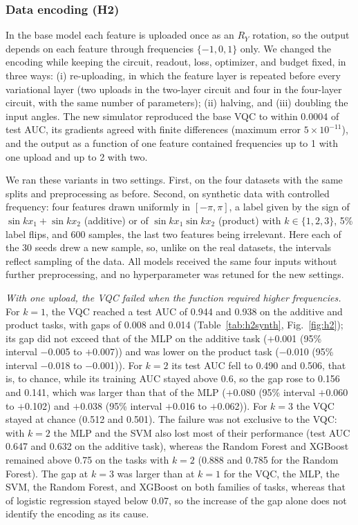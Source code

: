 \subsubsection{Data encoding (H2)}

In the base model each feature is uploaded once as an $R_Y$ rotation, so the output depends on each feature through frequencies $\{-1,0,1\}$ only. We changed the encoding while keeping the circuit, readout, loss, optimizer, and budget fixed, in three ways: (i) re-uploading, in which the feature layer is repeated before every variational layer (two uploads in the two-layer circuit and four in the four-layer circuit, with the same number of parameters); (ii) halving, and (iii) doubling the input angles. The new simulator reproduced the base VQC to within 0.0004 of test AUC, its gradients agreed with finite differences (maximum error $5\times10^{-11}$), and the output as a function of one feature contained frequencies up to 1 with one upload and up to 2 with two.

We ran these variants in two settings. First, on the four datasets with the same splits and preprocessing as before. Second, on synthetic data with controlled frequency: four features drawn uniformly in $[-\pi,\pi]$, a label given by the sign of $\sin kx_1+\sin kx_2$ (additive) or of $\sin kx_1\sin kx_2$ (product) with $k\in\{1,2,3\}$, 5\% label flips, and 600 samples, the last two features being irrelevant. Here each of the 30 seeds drew a new sample, so, unlike on the real datasets, the intervals reflect sampling of the data. All models received the same four inputs without further preprocessing, and no hyperparameter was retuned for the new settings.

\textit{With one upload, the VQC failed when the function required higher frequencies.} For $k=1$, the VQC reached a test AUC of 0.944 and 0.938 on the additive and product tasks, with gaps of 0.008 and 0.014 (Table~\ref{tab:h2synth}, Fig.~\ref{fig:h2}); its gap did not exceed that of the MLP on the additive task ($+$0.001 (95\% interval $-$0.005 to $+$0.007)) and was lower on the product task ($-$0.010 (95\% interval $-$0.018 to $-$0.001)). For $k=2$ its test AUC fell to 0.490 and 0.506, that is, to chance, while its training AUC stayed above 0.6, so the gap rose to 0.156 and 0.141, which was larger than that of the MLP ($+$0.080 (95\% interval $+$0.060 to $+$0.102) and $+$0.038 (95\% interval $+$0.016 to $+$0.062)). For $k=3$ the VQC stayed at chance (0.512 and 0.501). The failure was not exclusive to the VQC: with $k=2$ the MLP and the SVM also lost most of their performance (test AUC 0.647 and 0.632 on the additive task), whereas the Random Forest and XGBoost remained above 0.75 on the tasks with $k=2$ (0.888 and 0.785 for the Random Forest). The gap at $k=3$ was larger than at $k=1$ for the VQC, the MLP, the SVM, the Random Forest, and XGBoost on both families of tasks, whereas that of logistic regression stayed below 0.07, so the increase of the gap alone does not identify the encoding as its cause.


